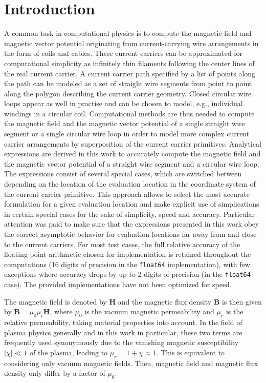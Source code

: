 \section{Introduction}
\label{sec:introduction}
A common task in computational physics is to compute the magnetic field and magnetic vector potential
originating from current-carrying wire arrangements in the form of coils and cables.
These current carriers can be approximated for computational simplicity as infinitely thin filaments
following the center lines of the real current carrier.
A current carrier path specified by a list of points along the path
can be modeled as a set of straight wire segments from point to point along the polygon describing the current carrier geometry.
Closed circular wire loops appear as well in practise and can be chosen to model, e.g.,
individual windings in a circular coil.
Computational methods are thus needed to compute the magnetic field and the magnetic vector potential
of a single straight wire segment or a single circular wire loop
in order to model more complex current carrier arrangements
by superposition of the current carrier primitives.
Analytical expressions are derived in this work to accurately compute
the magnetic field and the magnetic vector potential of a straight wire segment
and a circular wire loop. The expressions consist of several special cases,
which are switched between depending on the location of the evaluation location
in the coordinate system of the current carrier primitive.
This approach allows to select the most accurate formulation
for a given evaluation location and make explicit use of simplications
in certain special cases for the sake of simplicity, speed and accuracy.
Particular attention was paid to make sure that the expressions presented in this work
obey the correct asymptotic behavior for evaluation locations
far away from and close to the current carriers.
For most test cases, the full relative accuracy of the floating point
arithmetic chosen for implementation is retained throughout the computations
(16 digits of precision in the \texttt{float64} implementation),
with few exceptions where accuracy drops by up to 2 digits of precision
(in the \texttt{float64} case).
The provided implementations have not been optimized for speed.

The magnetic field is denoted by $\mathbf{H}$ and
the magnetic flux density $\mathbf{B}$ is then given by $\mathbf{B} = \mu_0 \mu_\mathrm{r} \mathbf{H}$,
where $\mu_0$ is the vacuum magnetic permeability
and $\mu_r$ is the relative permeability, taking material properties into account.
In the field of plasma physics generally and in this work in particular,
these two terms are frequently used synonymously
due to the vanishing magnetic susceptibility $|\chi| \ll 1$ of the plasma,
leading to $\mu_r = 1+\chi \approx 1$.
This is equivalent to considering only vacuum magnetic fields.
Then, magnetic field and magnetic flux density only differ by a factor of $\mu_0$.
